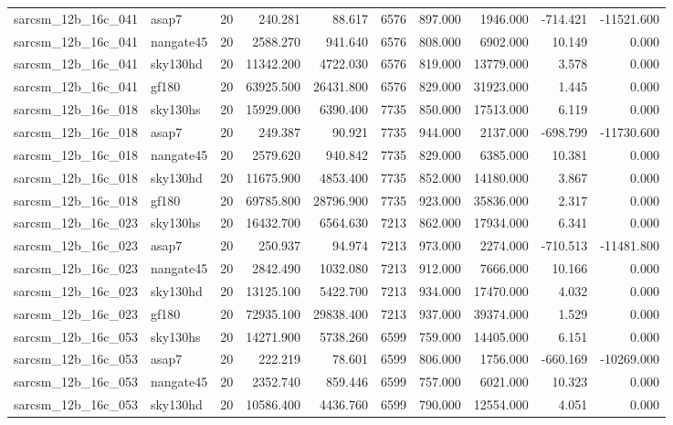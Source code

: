 \begin{longtable}{llrrrrrrrr}
sarcsm\_12b\_16c\_041 & asap7 & 20 & 240.281 & 88.617 & 6576 & 897.000 & 1946.000 & -714.421 & -11521.600 \\
sarcsm\_12b\_16c\_041 & nangate45 & 20 & 2588.270 & 941.640 & 6576 & 808.000 & 6902.000 & 10.149 & 0.000 \\
sarcsm\_12b\_16c\_041 & sky130hd & 20 & 11342.200 & 4722.030 & 6576 & 819.000 & 13779.000 & 3.578 & 0.000 \\
sarcsm\_12b\_16c\_041 & gf180 & 20 & 63925.500 & 26431.800 & 6576 & 829.000 & 31923.000 & 1.445 & 0.000 \\
sarcsm\_12b\_16c\_018 & sky130hs & 20 & 15929.000 & 6390.400 & 7735 & 850.000 & 17513.000 & 6.119 & 0.000 \\
sarcsm\_12b\_16c\_018 & asap7 & 20 & 249.387 & 90.921 & 7735 & 944.000 & 2137.000 & -698.799 & -11730.600 \\
sarcsm\_12b\_16c\_018 & nangate45 & 20 & 2579.620 & 940.842 & 7735 & 829.000 & 6385.000 & 10.381 & 0.000 \\
sarcsm\_12b\_16c\_018 & sky130hd & 20 & 11675.900 & 4853.400 & 7735 & 852.000 & 14180.000 & 3.867 & 0.000 \\
sarcsm\_12b\_16c\_018 & gf180 & 20 & 69785.800 & 28796.900 & 7735 & 923.000 & 35836.000 & 2.317 & 0.000 \\
sarcsm\_12b\_16c\_023 & sky130hs & 20 & 16432.700 & 6564.630 & 7213 & 862.000 & 17934.000 & 6.341 & 0.000 \\
sarcsm\_12b\_16c\_023 & asap7 & 20 & 250.937 & 94.974 & 7213 & 973.000 & 2274.000 & -710.513 & -11481.800 \\
sarcsm\_12b\_16c\_023 & nangate45 & 20 & 2842.490 & 1032.080 & 7213 & 912.000 & 7666.000 & 10.166 & 0.000 \\
sarcsm\_12b\_16c\_023 & sky130hd & 20 & 13125.100 & 5422.700 & 7213 & 934.000 & 17470.000 & 4.032 & 0.000 \\
sarcsm\_12b\_16c\_023 & gf180 & 20 & 72935.100 & 29838.400 & 7213 & 937.000 & 39374.000 & 1.529 & 0.000 \\
sarcsm\_12b\_16c\_053 & sky130hs & 20 & 14271.900 & 5738.260 & 6599 & 759.000 & 14405.000 & 6.151 & 0.000 \\
sarcsm\_12b\_16c\_053 & asap7 & 20 & 222.219 & 78.601 & 6599 & 806.000 & 1756.000 & -660.169 & -10269.000 \\
sarcsm\_12b\_16c\_053 & nangate45 & 20 & 2352.740 & 859.446 & 6599 & 757.000 & 6021.000 & 10.323 & 0.000 \\
sarcsm\_12b\_16c\_053 & sky130hd & 20 & 10586.400 & 4436.760 & 6599 & 790.000 & 12554.000 & 4.051 & 0.000 \\

\end{longtable}
